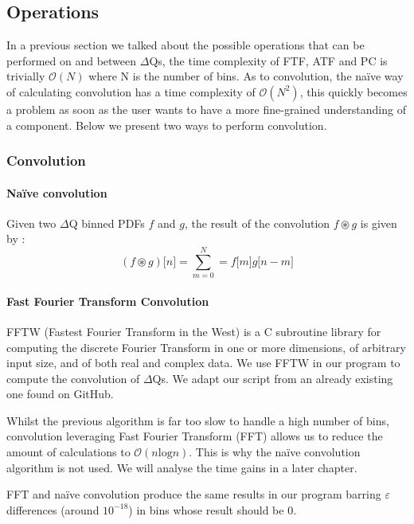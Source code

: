       \subsection{Operations}
    In a previous section we talked about the possible operations that can be performed on and between $\Delta$Qs, the time complexity of FTF, ATF and PC is trivially $\mathcal{O}(N)$ where N is the number of bins. As to convolution, the naïve way of calculating convolution has a time complexity of $\mathcal{O}(N^2)$, this quickly becomes a problem as soon as the user wants to have a more fine-grained understanding of a component. Below we present two ways to perform convolution.

        \subsubsection{Convolution}
        
        \paragraph{Naïve convolution}
        Given two $\Delta$Q binned PDFs $f$ and $g$, the result of the convolution $f \circledast g$ is given by \cite{conv}: 
        \begin{equation}
            (f \circledast g)\lbrack n \rbrack = \sum_{m = 0}^{N} = f\lbrack m \rbrack g \lbrack n - m \rbrack  
            \label{eq:discconv}
        \end{equation}
 
    \paragraph{Fast Fourier Transform Convolution}
        FFTW (Fastest Fourier Transform in the West) is a C subroutine library \cite{fftw3} for computing the discrete Fourier Transform in one or more dimensions, of arbitrary input size, and of both real and complex data. We use FFTW in our program to compute the convolution of $\Delta$Qs. We adapt our script from an already existing one found on GitHub. \cite{fft}
    
    Whilst the previous algorithm is far too slow to handle a high number of bins, convolution leveraging Fast Fourier Transform (FFT) allows us to reduce the amount of calculations to $\mathcal{O}(n \text{log} n)$. This is why the naïve convolution algorithm is not used. We will analyse the time gains in a later chapter.
    
    FFT and naïve convolution produce the same results in our program barring $\varepsilon$ differences (around $10^{-18}$) in bins whose result should be 0.
    
